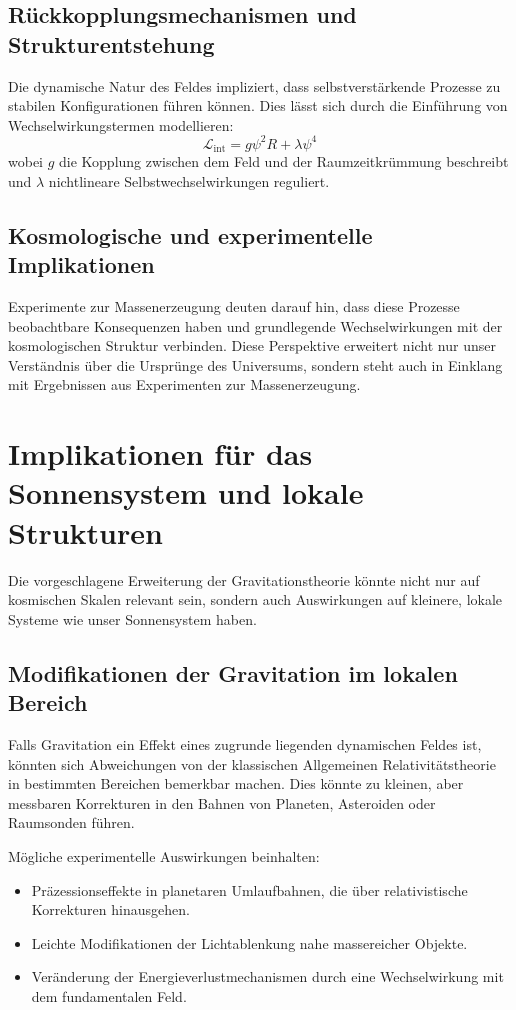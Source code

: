 \documentclass[a4paper,11pt]{article}
\begin{document}
	\subsection{Rückkopplungsmechanismen und Strukturentstehung}
	Die dynamische Natur des Feldes impliziert, dass selbstverstärkende Prozesse zu stabilen Konfigurationen führen können. Dies lässt sich durch die Einführung von Wechselwirkungstermen modellieren:
	\begin{equation}
		\mathcal{L}_{\text{int}} = g \psi^2 R + \lambda \psi^4
	\end{equation}
	wobei $g$ die Kopplung zwischen dem Feld und der Raumzeitkrümmung beschreibt und $\lambda$ nichtlineare Selbstwechselwirkungen reguliert.
	
	\subsection{Kosmologische und experimentelle Implikationen}
	Experimente zur Massenerzeugung deuten darauf hin, dass diese Prozesse beobachtbare Konsequenzen haben und grundlegende Wechselwirkungen mit der kosmologischen Struktur verbinden. Diese Perspektive erweitert nicht nur unser Verständnis über die Ursprünge des Universums, sondern steht auch in Einklang mit Ergebnissen aus Experimenten zur Massenerzeugung.
	\section{Implikationen für das Sonnensystem und lokale Strukturen}
	Die vorgeschlagene Erweiterung der Gravitationstheorie könnte nicht nur auf kosmischen Skalen relevant sein, sondern auch Auswirkungen auf kleinere, lokale Systeme wie unser Sonnensystem haben.  
	
	\subsection{Modifikationen der Gravitation im lokalen Bereich}
	Falls Gravitation ein Effekt eines zugrunde liegenden dynamischen Feldes ist, könnten sich Abweichungen von der klassischen Allgemeinen Relativitätstheorie in bestimmten Bereichen bemerkbar machen. Dies könnte zu kleinen, aber messbaren Korrekturen in den Bahnen von Planeten, Asteroiden oder Raumsonden führen.  
	
	Mögliche experimentelle Auswirkungen beinhalten:
	\begin{itemize}
		\item Präzessionseffekte in planetaren Umlaufbahnen, die über relativistische Korrekturen hinausgehen.
		\item Leichte Modifikationen der Lichtablenkung nahe massereicher Objekte.
		\item Veränderung der Energieverlustmechanismen durch eine Wechselwirkung mit dem fundamentalen Feld.
	\end{itemize}
	
\end{document}
